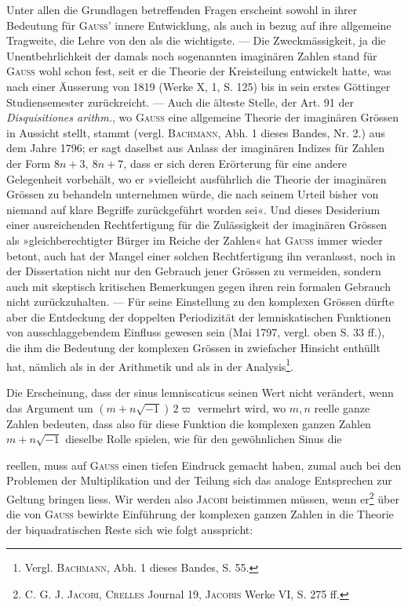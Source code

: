 \par{}
\indent Unter allen die Grundlagen betreffenden Fragen erscheint sowohl in ihrer
Bedeutung für \textsc{Gauss’} innere Entwicklung, als auch in bezug auf ihre allgemeine
Tragweite, die Lehre von den  als die wichtigste.
— Die Zweckmässigkeit, ja die Unentbehrlichkeit der damals noch sogenannten
imaginären Zahlen stand für \textsc{Gauss} wohl schon fest, seit er die Theorie der
Kreisteilung entwickelt hatte, was nach einer Äusserung von 1819 (Werke
X, 1, S. 125) bis in sein erstes Göttinger Studiensemester zurückreicht. —
Auch die älteste Stelle, der Art. 91 der \textit{Disquisitiones arithm.}, wo \textsc{Gauss} eine
allgemeine Theorie der imaginären Grössen in Aussicht stellt, stammt (vergl.
\textsc{Bachmann}, Abh. 1 dieses Bandes, Nr. 2.) aus dem Jahre 1796; er sagt daselbst
aus Anlass der imaginären Indizes für Zahlen der Form \(8n+3,\ 8n+7\),
dass er sich deren Erörterung für eine andere Gelegenheit vorbehält, wo er
»vielleicht ausführlich die Theorie der imaginären Grössen zu behandeln
unternehmen würde, die nach seinem Urteil bisher von niemand auf klare
Begriffe zurückgeführt worden sei«. Und dieses Desiderium einer ausreichenden
Rechtfertigung für die Zulässigkeit der imaginären Grössen als »gleichberechtigter
Bürger im Reiche der Zahlen« hat \textsc{Gauss} immer wieder betont, auch
hat der Mangel einer solchen Rechtfertigung ihn veranlasst, noch in der Dissertation
nicht nur den Gebrauch jener Grössen zu vermeiden, sondern auch mit
skeptisch kritischen Bemerkungen gegen ihren rein formalen Gebrauch nicht
zurückzuhalten. — Für seine Einstellung zu den komplexen Grössen dürfte
aber die Entdeckung der doppelten Periodizität der lemniskatischen Funktionen
von ausschlaggebendem Einfluss gewesen sein (Mai 1797, vergl. oben S. 33 ff.),
die ihm die Bedeutung der komplexen Grössen in zwiefacher Hinsicht enthüllt
hat, nämlich als  in der Arithmetik und als  in der
Analysis\footnote{Vergl. \textsc{Bachmann}, Abh. 1 dieses Bandes, S. 55.}.

Die Erscheinung, dass der sinus lemniscaticus seinen Wert nicht verändert,
wenn das Argument um \((m+n\sqrt{-1})\,2\varpi\) vermehrt wird, wo \(m,n\) reelle
ganze Zahlen bedeuten, dass also für diese Funktion die komplexen ganzen
Zahlen \(m+n\sqrt{-1}\) dieselbe Rolle spielen, wie für den gewöhnlichen Sinus die\par
\clearpage{}
\noindent reellen, muss auf \textsc{Gauss} einen tiefen Eindruck gemacht haben, zumal auch
bei den Problemen der Multiplikation und der Teilung sich das analoge Entsprechen
zur Geltung bringen liess. Wir werden also \textsc{Jacobi} beistimmen
müssen, wenn er\footnote{\textsc{C. G. J. Jacobi}, \textsc{Crelles} Journal 19, \textsc{Jacobis} Werke VI, S. 275 ff.} über die von \textsc{Gauss} bewirkte Einführung der komplexen
ganzen Zahlen in die Theorie der biquadratischen Reste sich wie folgt ausspricht:

